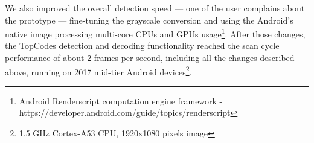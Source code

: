 We also improved the overall detection speed --- one of the user complains about the prototype --- fine-tuning the grayscale conversion and using the Android's native image processing multi-core CPUs and GPUs usage\footnote{Android Renderscript computation engine framework - https://developer.android.com/guide/topics/renderscript}. After those changes, the TopCodes detection and decoding functionality reached the scan cycle performance of about 2 frames per second, including all the changes described above, running on 2017 mid-tier Android devices\footnote{1.5 GHz Cortex-A53 CPU, 1920x1080 pixels image}.












